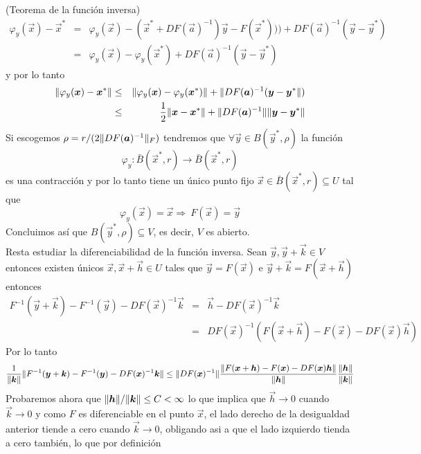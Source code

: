 \begin{demostracion}{\hspace{2mm} (Teorema de la funci\'on inversa)}
\begin{eqnarray*}
\varphi_y(\vec{x})-\vec{x}^* & = & \varphi_y(\vec{x})-(\vec{x}^*+DF(\vec{a})^{-1})\vec{y}-F(\vec{x}^*)))+DF(\vec{a})^{-1}(\vec{y}-\vec{y}^*)\\
                      & = & \varphi_y(\vec{x})-\varphi_y(\vec{x}^*)+DF(\vec{a})^{-1}(\vec{y}-\vec{y}^*)
\end{eqnarray*}
y por lo tanto
\begin{eqnarray*}
\lVert\varphi_y(\boldsymbol{x})-\boldsymbol{x}^*\rVert & \leq &
\lVert\varphi_y(\boldsymbol{x})-\varphi_y(\boldsymbol{x}^*)\rVert+\lVert DF(\boldsymbol{a})^{-1}(\boldsymbol{y}-\boldsymbol{y}^*\rVert)\\
& \leq & \frac{1}{2}\lVert\boldsymbol{x}-\boldsymbol{x}^*\rVert+\lVert DF(\boldsymbol{a})^{-1}\rVert\lVert\boldsymbol{y}-\boldsymbol{y}^*\rVert
\end{eqnarray*}
Si escogemos $\rho=r/(2\lVert DF(\boldsymbol{a})^{-1}\rVert_F)$ tendremos que
$\forall \vec{y}\in B(\vec{y}^*,\rho)$ la funci\'on 
$$\varphi_y:\bar{B}(\vec{x}^*,r)\to \bar{B}(\vec{x}^*,r)$$
 es una contracci\'on y por lo tanto
tiene un \'unico punto fijo $\vec{x}\in \bar{B}(\vec{x}^*,r)\subseteq U$ tal
que
\[\varphi_y(\vec{x})=\vec{x}\Rightarrow\: F(\vec{x})=\vec{y}\]
Concluimos as\'i que $B(\vec{y}^*,\rho)\subseteq V$, es decir, $V$
es abierto. \\ Resta estudiar la diferenciabilidad de la funci\'on
inversa. Sean $\vec{y},\vec{y}+\vec{k}\in V$ entonces existen \'unicos $\vec{x},\vec{x}+\vec{h}\in U$
tales que $ \vec{y}=F(\vec{x})$ e $\vec{y}+\vec{k}=F(\vec{x}+\vec{h})$ entonces
\begin{eqnarray*}
F^{-1}(\vec{y}+\vec{k})-F^{-1}(\vec{y})-DF(\vec{x})^{-1}\vec{k} &=& \vec{h}-DF(\vec{x})^{-1}\vec{k} \\
                                  &=& DF(\vec{x})^{-1}(F(\vec{x}+\vec{h})-F(\vec{x})-DF(\vec{x})\vec{h})
\end{eqnarray*}
Por lo tanto
\begin{eqnarray*}
\frac{1}{\lVert\boldsymbol{k}\rVert}\lVert F^{-1}(\boldsymbol{y}+\boldsymbol{k})-F^{-1}(\boldsymbol{y})-DF(\boldsymbol{x})^{-1}\boldsymbol{k}\rVert \leq \lVert DF(\boldsymbol{x})^{-1}\rVert\frac{\lVert F(\boldsymbol{x}+\boldsymbol{h})-F(\boldsymbol{x})-DF(\boldsymbol{x})\boldsymbol{h}\rVert}{\lVert\boldsymbol{h}\rVert}
\frac{\lVert\boldsymbol{h}\rVert}{\lVert\boldsymbol{k}\rVert}
\end{eqnarray*}
Probaremos ahora que $\lVert\boldsymbol{h}\rVert/\lVert\boldsymbol{k}\rVert\leq C <\infty$ lo que
implica que $\vec{h}\rightarrow 0$ cuando $\vec{k}\rightarrow 0$ y como $F$ es
diferenciable en el punto $\vec{x}$, el lado derecho de la desigualdad
anterior tiende a cero cuando $\vec{k}\rightarrow 0$, obligando asi a que el
lado izquierdo tienda a cero tambi\'en, lo que por definici\'on

\end{demostracion}
